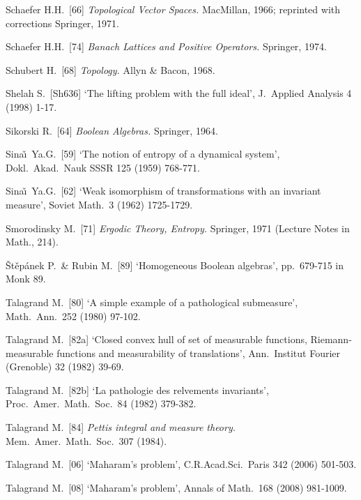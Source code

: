 {Schaefer H.H.\ [66] {\it Topological Vector Spaces.}  MacMillan, 1966;  reprinted with corrections Springer, 1971.
\cmmnt{[3A4Ad, 3A5Jb.]}

Schaefer H.H.\ [74] {\it Banach Lattices and Positive Operators.}
Springer, 1974.   

Schubert H.\ [68] {\it Topology.}  Allyn \& Bacon, 1968.
\cmmnt{[\S3A3, \S3A4.]}

Shelah S.\ [Sh636] `The lifting problem with the full ideal',
J.\ Applied Analysis 4 (1998) 1-17.   \cmmnt{[341Lh.]}

Sikorski R.\ [64] {\it Boolean Algebras.}  Springer, 1964.

Sina\v\i\ Ya.G.\ [59] `The notion of entropy of a dynamical system',
Dokl.\ Akad.\ Nauk SSSR 125 (1959) 768-771.  \cmmnt{[385P.]}

Sina\v\i\ Ya.G.\ [62] `Weak isomorphism of transformations with an invariant measure', Soviet Math.\ 3 (1962) 1725-1729.
\cmmnt{[387E.]}

Smorodinsky M.\ [71] {\it Ergodic Theory, Entropy.}
Springer, 1971 (Lecture Notes in Math., 214).
\cmmnt{[\S387 {\it notes\/}.]}

\v St\v ep\'anek P.\ \& Rubin M.\ [89] `Homogeneous Boolean algebras',
pp.\ 679-715 in {\smc Monk 89}.   \cmmnt{[382S, \S382 {\it notes\/}.]}

\medskip %

Talagrand M.\ [80] `A simple example of a pathological submeasure',
Math.\ Ann.\ 252 (1980) 97-102.

Talagrand M.\ [82a] `Closed convex hull of set of measurable functions,
Riemann-\vthsp measurable functions and measurability of translations',
Ann.\ Institut Fourier (Grenoble) 32 (1982) 39-69.
\cmmnt{[\S346 {\it notes\/}.]}

Talagrand M.\ [82b] `La pathologie des relvements invariants',
Proc.\ Amer.\ Math.\ Soc.\ 84 (1982) 379-382.
\cmmnt{[345F.]}

Talagrand M.\ [84] {\it Pettis integral and measure theory.}
Mem.\ Amer.\ Math.\ Soc.\  307 (1984).
\cmmnt{[\S346 {\it notes\/}.]}

Talagrand M.\ [06] `Maharam's problem', C.R.Acad.Sci.\ Paris 342 (2006)
501-503.

Talagrand M.\ [08] `Maharam's problem', Annals of Math.\ 168 (2008)
981-1009.
\cmmnt{[\S394.]}

}
